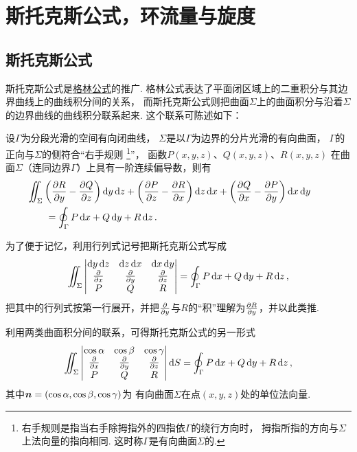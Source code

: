 \section{斯托克斯公式，环流量与旋度}
\subsection{斯托克斯公式}
斯托克斯公式是\hyperref[equation:线积分与面积分.格林公式]{格林公式}的推广.
格林公式表达了平面闭区域上的二重积分与其边界曲线上的曲线积分间的关系，
而斯托克斯公式则把曲面\(\Sigma\)上的曲面积分与沿着\(\Sigma\)的边界曲线的曲线积分联系起来.
这个联系可陈述如下：

\begin{theorem}[斯托克斯公式]
设\(\Gamma\)为分段光滑的空间有向闭曲线，
\(\Sigma\)是以\(\Gamma\)为边界的分片光滑的有向曲面，
\(\Gamma\)的正向与\(\Sigma\)的侧符合“右手规则%
\footnote{右手规则是指当右手除拇指外的四指依\(\Gamma\)的绕行方向时，
拇指所指的方向与\(\Sigma\)上法向量的指向相同.
这时称\(\Gamma\)是有向曲面\(\Sigma\)的.}”，
函数\(P(x,y,z)\)、\(Q(x,y,z)\)、\(R(x,y,z)\)
在曲面\(\Sigma\)（连同边界\(\Gamma\)）上具有一阶连续偏导数，则有
\begin{equation}\label{equation:线积分与面积分.斯托克斯公式}
	\begin{split}
		&\hspace{-20pt}\iint_\Sigma
			\left( \pdv{R}{y} - \pdv{Q}{z} \right)\dd{y}\dd{z}
			+\left( \pdv{P}{z} - \pdv{R}{x} \right)\dd{z}\dd{x}
			+\left( \pdv{Q}{x} - \pdv{P}{y} \right)\dd{x}\dd{y} \\
		&= \oint_\Gamma P\dd{x}+Q\dd{y}+R\dd{z}.
	\end{split}
\end{equation}
\end{theorem}

为了便于记忆，利用行列式记号把斯托克斯公式写成\begin{equation*}
	\iint_\Sigma \begin{vmatrix}
		\dd{y}\dd{z} & \dd{z}\dd{x} & \dd{x}\dd{y} \\
		\pdv{x} & \pdv{y} & \pdv{z} \\
		P & Q & R
	\end{vmatrix}
	= \oint_\Gamma P\dd{x}+Q\dd{y}+R\dd{z},
\end{equation*}
把其中的行列式按第一行展开，并把\(\pdv{y}\)与\(R\)的“积”理解为\(\pdv{R}{y}\)，并以此类推.

利用两类曲面积分间的联系，可得斯托克斯公式的另一形式\begin{equation*}
	\iint_\Sigma \begin{vmatrix}
		\cos\alpha & \cos\beta & \cos\gamma \\
		\pdv{x} & \pdv{y} & \pdv{z} \\
		P & Q & R
	\end{vmatrix} \dd{S}
	= \oint_\Gamma P\dd{x}+Q\dd{y}+R\dd{z},
\end{equation*}
其中\(\boldsymbol{n}=(\cos\alpha,\cos\beta,\cos\gamma)\)为
有向曲面\(\Sigma\)在点\((x,y,z)\)处的单位法向量.

